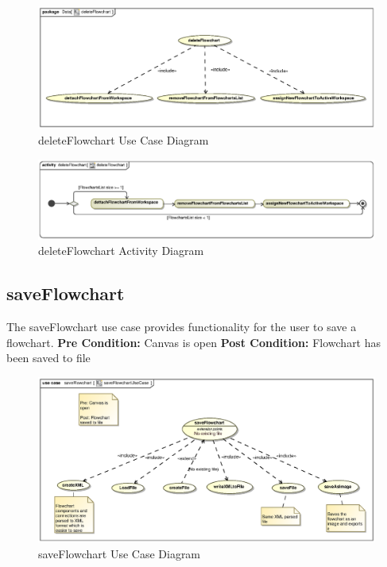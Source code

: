 \documentclass[12pt,a4paper,titlepage]{article}
\begin{document}
\begin{figure}[H]
  \centering
\includegraphics[width=500px]{deleteFlowchart.eps}
\caption{deleteFlowchart Use Case Diagram}
\end{figure}

\begin{figure}[H]
  \centering
\includegraphics[width=500px]{deleteFlowchartActivity.eps}
\caption{deleteFlowchart Activity Diagram}
\end{figure}

\newpage
\subsection{saveFlowchart}
The saveFlowchart use case provides functionality for the user to save a flowchart.\newline\newline
\textbf{Pre Condition:} Canvas is open\newline\newline
\textbf{Post Condition:} Flowchart has been saved to file

\begin{figure}[H]
  \centering
\includegraphics[width=500px]{saveFlowchartUseCase.eps}
\caption{saveFlowchart Use Case Diagram}
\end{figure}
\end{document}
